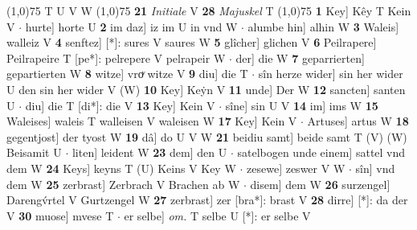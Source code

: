 \documentclass[8pt,a4paper,notitlepage]{article}
\begin{document}
\begin{table}[ht]
\begin{minipage}[t]{0.5\linewidth}
\begin{tabular}{rl}
\end{tabular}
\scriptsize
\line(1,0){75} \newline
T U V W \newline
\line(1,0){75} \newline
\textbf{21} \textit{Initiale} V  \textbf{28} \textit{Majuskel} T  \newline
\line(1,0){75} \newline
\textbf{1} Key] Kêy T Kein V  $\cdot$ hurte] horte U \textbf{2} im daz] iz im U in vnd W  $\cdot$ alumbe hin] alhin W \textbf{3} Waleis] walleiz V \textbf{4} senftez] [*]: sures V saures W \textbf{5} glîcher] glichen V \textbf{6} Peilrapere] Peilrapeire T [pe*]: pelrepere V pelrapeir W  $\cdot$ der] die W \textbf{7} geparrierten] gepartierten W \textbf{8} witze] vroͮ witze V \textbf{9} diu] die T  $\cdot$ sîn herze wider] sin her wider U den sin her wider V (W) \textbf{10} Key] Keẏn V \textbf{11} unde] Der W \textbf{12} sancten] santen U  $\cdot$ diu] die T [di*]: die V \textbf{13} Key] Kein V  $\cdot$ sîne] sin U V \textbf{14} im] ims W \textbf{15} Waleises] waleis T walleisen V waleisen W \textbf{17} Key] Kein V  $\cdot$ Artuses] artus W \textbf{18} gegentjost] der tyost W \textbf{19} dâ] do U V W \textbf{21} beidiu samt] beide samt T (V) (W) Beisamit U  $\cdot$ liten] leident W \textbf{23} dem] den U  $\cdot$ satelbogen unde einem] sattel vnd dem W \textbf{24} Keys] keyns T (U) Keins V Key W  $\cdot$ zesewe] zeswer V W  $\cdot$ sîn] vnd dem W \textbf{25} zerbrast] Zerbrach V Brachen ab W  $\cdot$ disem] dem W \textbf{26} surzengel] Darengv́rtel V Gurtzengel W \textbf{27} zerbrast] zer [bra*]: brast V \textbf{28} dirre] [*]: da der V \textbf{30} muose] mvese T  $\cdot$ er selbe] \textit{om.} T selbe U [*]: er selbe V \newline
\end{minipage}
\end{table}
\end{document}
